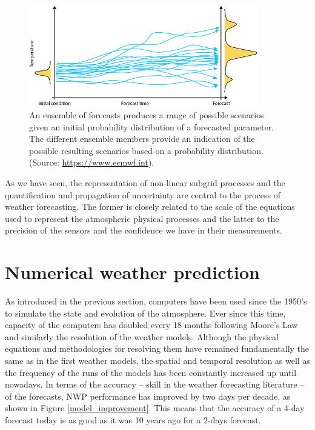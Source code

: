 \medskip

\begin{figure}[h]
 \centerline{\includegraphics[width=10cm]{ensemble-forecasting.jpg}} \caption{An ensemble of forecasts produces a range of possible scenarios given an initial probability distribution of a forecasted parameter. The different ensemble members provide an indication of the possible resulting scenarios based on a probability distribution. (Source: \url{https://www.ecmwf.int}).}\label{ensemble}
\end{figure}

\medskip

As we have seen, the representation of non-linear subgrid processes and the quantification and propagation of uncertainty are central to the process of weather forecasting. The former is closely related to the scale of the equations used to represent the atmospheric physical processes and the latter to the precision of the sensors and the confidence we have in their measurements.



\section{Numerical weather prediction}

As introduced in the previous section, computers have been used since the 1950's to simulate the state and evolution of the atmosphere. Ever since this time, capacity of the computers has doubled every 18 months following Moore's Law and similarly the resolution of the weather models. Although the physical equations and methodologies for resolving them have remained fundamentally the same as in the first weather models, the spatial and temporal resolution as well as the frequency of the runs of the models has been constantly increased up until nowadays. In terms of the accuracy -- skill in the weather forecasting literature -- of the forecasts, NWP performance has improved by two days per decade, as shown in Figure \ref{model_improvement}. This means that the accuracy of a 4-day forecast today is as good as it was 10 years ago for a 2-days forecast.

